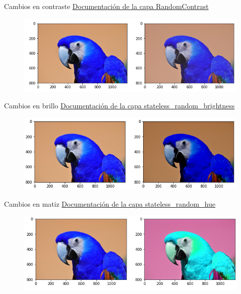 \begin{frame}{Cambios en contraste}
\textcolor{blue}{\href{https://keras.io/api/layers/preprocessing_layers/image_augmentation/random_contrast/}{Documentación de la capa RandomContrast}}
\begin{figure}
    \centering
    \includegraphics[width=\textwidth]{Slides/figures/Tema 3/Contrast.png}
\end{figure}
\end{frame}

\begin{frame}{Cambios en brillo}
\textcolor{blue}{\href{https://www.tensorflow.org/api_docs/python/tf/image/stateless_random_brightness}{Documentación de la capa stateless\_random\_brightness}}
\begin{figure}
    \centering
    \includegraphics[width=\textwidth]{Slides/figures/Tema 3/Birghtness.png}
\end{figure}
\end{frame}

\begin{frame}{Cambios en matiz}
\textcolor{blue}{\href{https://www.tensorflow.org/api_docs/python/tf/image/stateless_random_hue}{Documentación de la capa stateless\_random\_hue}}
\begin{figure}
    \centering
    \includegraphics[width=\textwidth]{Slides/figures/Tema 3/Hue.png}
\end{figure}
\end{frame}

